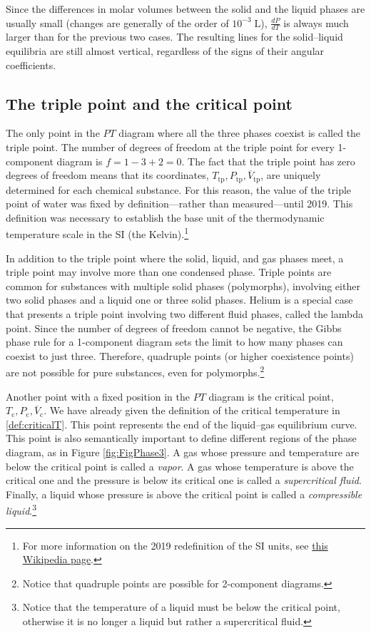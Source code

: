 \documentclass[
  9pt,
]{extbook}
\theoremstyle{definition}
\theoremstyle{definition}
\theoremstyle{definition}
\theoremstyle{definition}
\theoremstyle{remark}
\begin{document}
Since the differences in molar volumes between the solid and the liquid phases are usually small (changes are generally of the order of \(10^{-3}\;\mathrm{L}\)), \(\frac{dP}{dT}\) is always much larger than for the previous two cases. The resulting lines for the solid--liquid equilibria are still almost vertical, regardless of the signs of their angular coefficients.

\subsection{The triple point and the critical point}\label{the-triple-point-and-the-critical-point}

The only point in the \(PT\) diagram where all the three phases coexist is called the triple point. The number of degrees of freedom at the triple point for every 1-component diagram is \(f=1-3+2=0\). The fact that the triple point has zero degrees of freedom means that its coordinates, \({T_{\text{tp}},P_{\text{tp}},\overline{V}_{\text{tp}}}\), are uniquely determined for each chemical substance. For this reason, the value of the triple point of water was fixed by definition---rather than measured---until 2019. This definition was necessary to establish the base unit of the thermodynamic temperature scale in the SI (the Kelvin).\footnote{For more information on the 2019 redefinition of the SI units, see \href{https://en.wikipedia.org/wiki/2019_redefinition_of_the_SI_base_units}{this Wikipedia page}.}

In addition to the triple point where the solid, liquid, and gas phases meet, a triple point may involve more than one condensed phase. Triple points are common for substances with multiple solid phases (polymorphs), involving either two solid phases and a liquid one or three solid phases. Helium is a special case that presents a triple point involving two different fluid phases, called the lambda point. Since the number of degrees of freedom cannot be negative, the Gibbs phase rule for a 1-component diagram sets the limit to how many phases can coexist to just three. Therefore, quadruple points (or higher coexistence points) are not possible for pure substances, even for polymorphs.\footnote{Notice that quadruple points are possible for 2-component diagrams.}

Another point with a fixed position in the \(PT\) diagram is the critical point, \({T_{\text{c}},P_{\text{c}},\overline{V}_{\text{c}}}\). We have already given the definition of the critical temperature in \ref{def:criticalT}. This point represents the end of the liquid--gas equilibrium curve. This point is also semantically important to define different regions of the phase diagram, as in Figure \ref{fig:FigPhase3}. A gas whose pressure and temperature are below the critical point is called a \emph{vapor}. A gas whose temperature is above the critical one and the pressure is below its critical one is called a \emph{supercritical fluid}. Finally, a liquid whose pressure is above the critical point is called a \emph{compressible liquid}.\footnote{Notice that the temperature of a liquid must be below the critical point, otherwise it is no longer a liquid but rather a supercritical fluid.}
\end{document}

